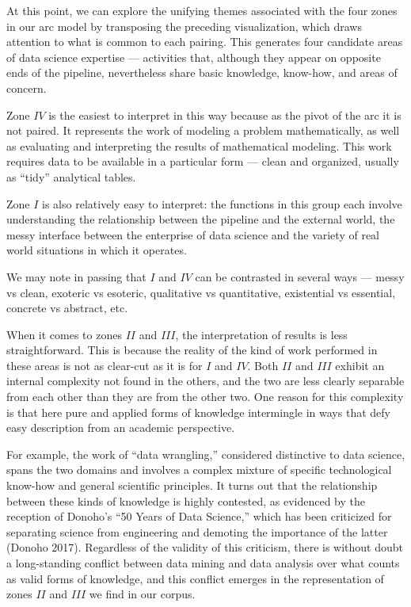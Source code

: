 \documentclass[
  letterpaper,
  DIV=11,
  numbers=noendperiod]{scrreprt}
\begin{document}
At this point, we can explore the unifying themes associated with the
four zones in our arc model by transposing the preceding visualization,
which draws attention to what is common to each pairing. This generates
four candidate areas of data science expertise --- activities that,
although they appear on opposite ends of the pipeline, nevertheless
share basic knowledge, know-how, and areas of concern.

Zone \(IV\) is the easiest to interpret in this way because as the pivot
of the arc it is not paired. It represents the work of modeling a
problem mathematically, as well as evaluating and interpreting the
results of mathematical modeling. This work requires data to be
available in a particular form --- clean and organized, usually as
``tidy'' analytical tables.

Zone \(I\) is also relatively easy to interpret: the functions in this
group each involve understanding the relationship between the pipeline
and the external world, the messy interface between the enterprise of
data science and the variety of real world situations in which it
operates.

We may note in passing that \(I\) and \(IV\) can be contrasted in
several ways --- messy vs clean, exoteric vs esoteric, qualitative vs
quantitative, existential vs essential, concrete vs abstract, etc.

When it comes to zones \(II\) and \(III\), the interpretation of results
is less straightforward. This is because the reality of the kind of work
performed in these areas is not as clear-cut as it is for \(I\) and
\(IV\). Both \(II\) and \(III\) exhibit an internal complexity not found
in the others, and the two are less clearly separable from each other
than they are from the other two. One reason for this complexity is that
here pure and applied forms of knowledge intermingle in ways that defy
easy description from an academic perspective.

For example, the work of ``data wrangling,'' considered distinctive to
data science, spans the two domains and involves a complex mixture of
specific technological know-how and general scientific principles. It
turns out that the relationship between these kinds of knowledge is
highly contested, as evidenced by the reception of Donoho's ``50 Years
of Data Science,'' which has been criticized for separating science from
engineering and demoting the importance of the latter (Donoho 2017).
Regardless of the validity of this criticism, there is without doubt a
long-standing conflict between data mining and data analysis over what
counts as valid forms of knowledge, and this conflict emerges in the
representation of zones \(II\) and \(III\) we find in our corpus.
\end{document}
